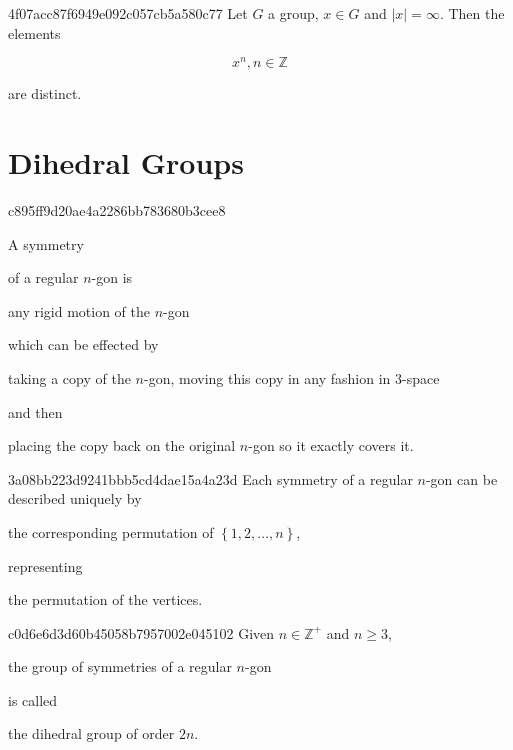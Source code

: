 \begin{note}{4f07acc87f6949e092c057cb5a580c77}
    Let \({ G }\) a group, \({ x \in G }\) and \({ \lvert x \rvert = \infty }\).
    Then the elements
    \begin{icloze}{2}
        \[
            x^{n}, n \in \mathbb Z
        \]
    \end{icloze}
    \begin{icloze}{1}are distinct.\end{icloze}
\end{note}

\section{Dihedral Groups}
\begin{note}{c895ff9d20ae4a2286bb783680b3cee8}
    \begin{icloze}{1}A symmetry\end{icloze} of a regular \({ n }\)-gon is \begin{icloze}{2}any rigid motion of the \({ n }\)-gon\end{icloze} which can be effected by \begin{icloze}{3}taking a copy of the \({ n }\)-gon, moving this copy in any fashion in \({ 3 }\)-space\end{icloze} and then \begin{icloze}{4}placing the copy back on the original \({ n }\)-gon so it exactly covers it.\end{icloze}
\end{note}

\begin{note}{3a08bb223d9241bbb5cd4dae15a4a23d}
    Each symmetry of a regular \({ n }\)-gon can be described uniquely by \begin{icloze}{1}the corresponding permutation of \({ \left\{ 1, 2, \ldots, n \right\} }\),\end{icloze} representing \begin{icloze}{2}the permutation of the vertices.\end{icloze}
\end{note}

\begin{note}{c0d6e6d3d60b45058b7957002e045102}
   Given \({ n \in \mathbb Z^{+} }\) and \({ n \geq 3 }\),
   \begin{icloze}{2}the group of symmetries of a regular \({ n }\)-gon\end{icloze} is called \begin{icloze}{1}the dihedral group of order \({ 2n }\).\end{icloze}
\end{note}


